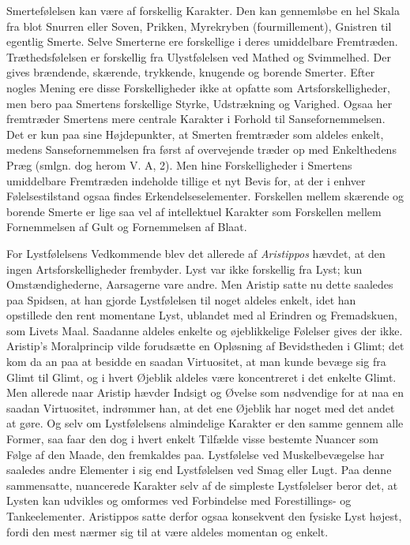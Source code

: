 \documentclass[12pt,a4paper,openany]{book}
\newcommand{\opage}[1]{\marginnote{\footnotesize\textit{[#1]}}}
\begin{document}
Smertefølelsen kan være af forskellig Karakter. Den kan gennemløbe en
hel Skala fra blot Snurren eller Soven, Prikken, Myrekryben
(fourmillement), Gnistren til egentlig Smerte. Selve Smerterne ere
forskellige i deres umiddelbare Fremtræden. Træthedsfølelsen er
forskellig fra Ulystfølelsen ved Mathed og Svimmelhed. Der gives
brændende, skærende, trykkende, knugende og borende Smerter. Efter
nogles Mening ere disse Forskelligheder ikke at opfatte som
Artsforskelligheder, men bero paa Smertens forskellige Styrke,
Udstrækning og Varighed. Ogsaa her fremtræder Smertens mere centrale
Karakter i Forhold til Sansefornemmelsen. Det er kun paa sine
Højdepunkter, at Smerten fremtræder som aldeles enkelt, medens
Sansefornemmelsen fra først af overvejende træder op med Enkelthedens
Præg (smlgn. dog herom V. A, 2). Men hine
\opage{272}Forskelligheder i Smertens umiddelbare Fremtræden indeholde
tillige et nyt Bevis for, at der i enhver Følelsestilstand ogsaa findes
Erkendelseselementer. Forskellen mellem skærende og borende Smerte er
lige saa vel af intellektuel Karakter som Forskellen mellem Fornemmelsen
af Gult og Fornemmelsen af Blaat.

For Lystfølelsens Vedkommende blev det allerede af \emph{Aristippos}
hævdet, at den ingen Artsforskelligheder frembyder. Lyst var ikke
forskellig fra Lyst; kun Omstændighederne, Aarsagerne vare andre. Men
Aristip satte nu dette saaledes paa Spidsen, at han gjorde Lystfølelsen
til noget aldeles enkelt, idet han opstillede den rent momentane Lyst,
ublandet med al Erindren og Fremadskuen, som Livets Maal. Saadanne
aldeles enkelte og øjeblikkelige Følelser gives der ikke. Aristip’s
Moralprincip vilde forudsætte en Opløsning af Bevidstheden i Glimt; det
kom da an paa at besidde en saadan Virtuositet, at man kunde bevæge sig
fra Glimt til Glimt, og i hvert Øjeblik aldeles være koncentreret i det
enkelte Glimt. Men allerede naar Aristip hævder Indsigt og Øvelse som
nødvendige for at naa en saadan Virtuositet, indrømmer han, at det ene
Øjeblik har noget med det andet at gøre. Og selv om Lystfølelsens
almindelige Karakter er den samme gennem alle Former, saa faar den dog i
hvert enkelt Tilfælde visse bestemte Nuancer som Følge af den Maade, den
fremkaldes paa. Lystfølelse ved Muskelbevægelse har saaledes andre
Elementer i sig end Lystfølelsen ved Smag eller Lugt. Paa denne
sammensatte, nuancerede Karakter selv af de simpleste Lystfølelser beror
det, at Lysten kan udvikles og omformes ved Forbindelse med
Forestillings- og Tankeelementer. Aristippos satte derfor ogsaa
konsekvent den fysiske Lyst højest, fordi den mest nærmer sig til at
være aldeles momentan og enkelt.
\end{document}
